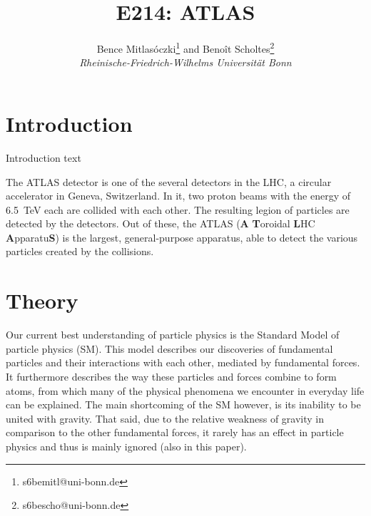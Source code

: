 \documentclass[twocolumn]{article}
\title{\textbf{E214: ATLAS}}
\author{Bence Mitlasóczki\thanks{s6bemitl@uni-bonn.de} and Beno\^it Scholtes\thanks{s6bescho@uni-bonn.de} \\ \textit{Rheinische-Friedrich-Wilhelms Universit\"at Bonn}}
\begin{document}
\renewcommand{\abstractname}{\vspace{-\baselineskip}} %
\maketitle
\saythanks %
\section{Introduction}
Introduction text

The ATLAS detector is one of the several detectors in the LHC, a circular accelerator in Geneva, Switzerland. In it, two proton beams with the energy of 6.5~TeV each are collided with each other. The resulting legion %
of particles are detected by the detectors. Out of these, the ATLAS (\textbf{A} \textbf{T}oroidal \textbf{L}HC \textbf{A}pparatu\textbf{S}) is the largest, general-purpose apparatus, able to detect the various particles created by the collisions. 

\section{Theory}
Our current best understanding of particle physics is the Standard Model of particle physics (SM). This model describes our discoveries of fundamental particles and their interactions with each other, mediated by fundamental forces. It furthermore describes the way these particles and forces combine to form atoms, from which many of the physical phenomena we encounter in everyday life can be explained. The main shortcoming of the SM however, is its inability to be united with gravity. That said, due to the relative weakness of gravity in comparison to the other fundamental forces, it rarely has an effect in particle physics and thus is mainly ignored (also in this paper).
\end{document}
